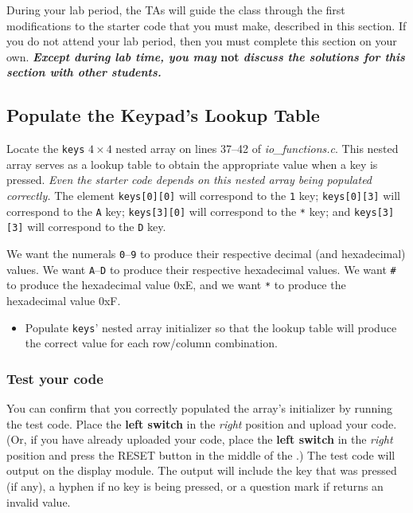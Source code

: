 During your lab period, the TAs will guide the class through the first modifications to the starter code that you must make, described in this section.
If you do not attend your lab period, then you must complete this section on your own.
\textbf{\textit{Except during lab time, you may }not\textit{ discuss the solutions for this section with other students.}}




\subsection{Populate the Keypad's Lookup Table} \label{subsec:populatekeypad}

Locate the \lstinline{keys} $4 \times 4$ nested array on lines 37--42 of \textit{io\_functions.c}.
This nested array serves as a lookup table to obtain the appropriate value when a key is pressed.
\textit{Even the starter code depends on this nested array being populated correctly.}
The element \lstinline{keys[0][0]} will correspond to the \texttt{1} key;
\lstinline{keys[0][3]} will correspond to the \texttt{A} key;
\lstinline{keys[3][0]} will correspond to the \texttt{*} key;
and \lstinline{keys[3][3]} will correspond to the \texttt{D} key.

We want the numerals \texttt{0}--\texttt{9} to produce their respective decimal (and hexadecimal) values.
We want \texttt{A}--\texttt{D} to produce their respective hexadecimal values.
We want \texttt{\#} to produce the hexadecimal value 0xE, and we want \texttt{*} to produce the hexadecimal value 0xF\@.

\begin{itemize}
    \item Populate \lstinline{keys}' nested array initializer so that the lookup table will produce the correct value for each row/column combination.
\end{itemize}

\subsubsection*{Test your code}

You can confirm that you correctly populated the array's initializer by running the test code.
Place the \textbf{left switch} in the \textit{right} position and upload your code.
(Or, if you have already uploaded your code, place the \textbf{left switch} in the \textit{right} position and press the RESET button in the middle of the \developmentboard.)
The test code will output on the display module.
The output will include the key that was pressed (if any), a hyphen if no key is being pressed, or a question mark if  returns an invalid value.

